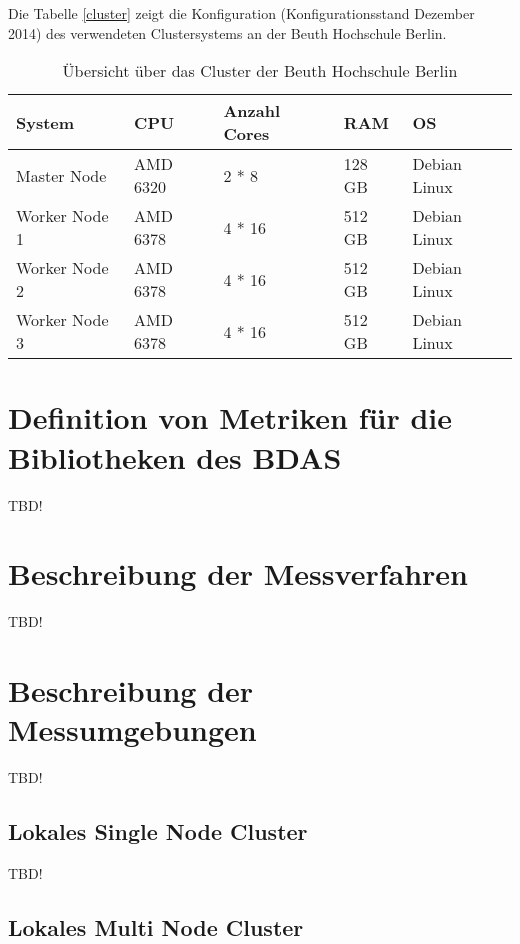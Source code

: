Die Tabelle \ref{cluster} zeigt die Konfiguration (Konfigurationsstand Dezember 2014) des verwendeten Clustersystems an der Beuth Hochschule Berlin. 

\begin{table}[!ht]
\centering
\begin{tabular}{| p{3cm} | p{2.2cm} |  p{3cm} |  p{1.2cm} | p{3cm} | }
\hline
System & CPU & Anzahl Cores & RAM & OS\\ \hline \hline
Master Node & AMD 6320 & 2 * 8  & 128 GB & Debian Linux \\ \hline
Worker Node 1 & AMD 6378 & 4 * 16 & 512 GB &  Debian Linux\\ \hline
Worker Node 2 & AMD 6378 & 4 * 16 & 512 GB &  Debian Linux\\ \hline
Worker Node 3 & AMD 6378 & 4 * 16 & 512 GB &  Debian Linux\\ \hline

\end{tabular}
\caption{Übersicht über das Cluster der Beuth Hochschule Berlin}
	\label{tab:cluster}
\end{table}  



\section{Definition von Metriken für die Bibliotheken des BDAS}
\label{section:definition der metriken}

TBD!



\section{Beschreibung der Messverfahren}
\label{section:messumgebungen}

TBD!


\section{Beschreibung der Messumgebungen}
\label{section:messumgebungen}

TBD!

\subsection{Lokales Single Node Cluster  }
\label{section:lokales single node}

TBD!

\subsection{Lokales Multi Node Cluster}
\label{section:tachyon}

